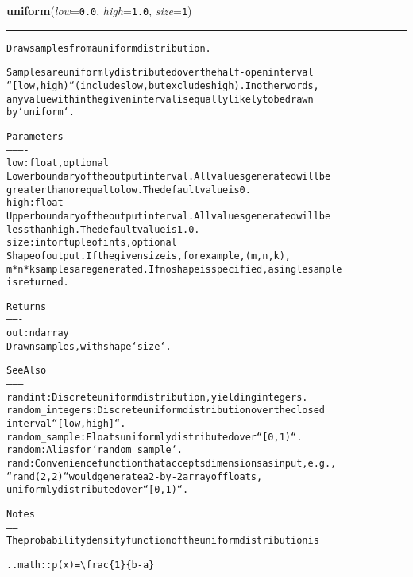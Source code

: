     \label{QSTK:qstklearn:mldiagnostics:uniform}

    \vspace{0.5ex}

\hspace{.8\funcindent}\begin{boxedminipage}{\funcwidth}

    \raggedright \textbf{uniform}(\textit{low}={\tt 0.0}, \textit{high}={\tt 1.0}, \textit{size}={\tt 1})

    \vspace{-1.5ex}

    \rule{\textwidth}{0.5\fboxrule}
\setlength{\parskip}{2ex}
\begin{alltt}
Draw samples from a uniform distribution.

Samples are uniformly distributed over the half-open interval
``[low, high)`` (includes low, but excludes high).  In other words,
any value within the given interval is equally likely to be drawn
by `uniform`.

Parameters
----------
low : float, optional
    Lower boundary of the output interval.  All values generated will be
    greater than or equal to low.  The default value is 0.
high : float
    Upper boundary of the output interval.  All values generated will be
    less than high.  The default value is 1.0.
size : int or tuple of ints, optional
    Shape of output.  If the given size is, for example, (m,n,k),
    m*n*k samples are generated.  If no shape is specified, a single sample
    is returned.

Returns
-------
out : ndarray
    Drawn samples, with shape `size`.

See Also
--------
randint : Discrete uniform distribution, yielding integers.
random\_integers : Discrete uniform distribution over the closed
                  interval ``[low, high]``.
random\_sample : Floats uniformly distributed over ``[0, 1)``.
random : Alias for `random\_sample`.
rand : Convenience function that accepts dimensions as input, e.g.,
       ``rand(2,2)`` would generate a 2-by-2 array of floats,
       uniformly distributed over ``[0, 1)``.

Notes
-----
The probability density function of the uniform distribution is

.. math:: p(x) = {\textbackslash}frac\{1\}\{b - a\}


\end{alltt}
\end{boxedminipage}
